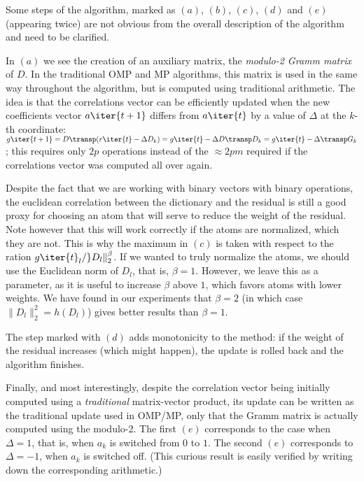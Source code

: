 \documentclass[twocolumn]{IEEEtran}
\begin{document}
Some steps of the algorithm, marked as $(a)$, $(b)$, $(c)$, $(d)$ and $(e)$ (appearing twice) are not obvious from the overall description of the algorithm and need to be clarified. 

In $(a)$ we see the creation of an auxiliary matrix, the \emph{modulo-2 Gramm matrix} of $D$. In the traditional OMP and MP algorithms, this matrix is used in the same way throughout the algorithm, but is computed using traditional arithmetic. The idea is that the correlations vector can be efficiently updated when the new coefficients vector $a\iter{t+1}$ differs from $a\iter{t}$ by a value of $\Delta$ at the $k$-th coordinate: $g\iter{t+1} = D\transp (r\iter{t} - \Delta D_k) = g\iter{t} - \Delta D\transp D_k = g\iter{t} - \Delta\transp G_k$; this requires only $2p$ operations instead of the $\approx 2pm$ required if the correlations vector was computed all over again.

Despite the fact that we are working with binary vectors with binary operations, the euclidean correlation between the dictionary and the residual is still a good proxy for choosing an atom that will serve to reduce the weight of the residual. Note however that this will work correctly if the atoms are normalized, which they are not. This is why 
the maximum in $(c)$ is taken with respect to the ration $g\iter{t}_l / \}D_l\|_2^\beta$. If we wanted to truly normalize the atoms, we should use the Euclidean norm of $D_l$, that is, $\beta=1$. However, we leave this as a parameter, as it is useful to increase $\beta$ above $1$, which favors atoms with lower weights. We have found in our experiments that $\beta=2$
(in which case $\|D_l\|_2^2=h(D_l)$) gives better results than $\beta=1$.

The step marked with $(d)$ adds monotonicity to the method: if the weight of the residual increases (which might happen), the update is rolled back and the algorithm finishes.

Finally, and most interestingly, despite the correlation vector being initially computed using a \emph{traditional} matrix-vector product, its update can be written as the traditional update used in OMP/MP, only that the Gramm matrix is actually computed using the modulo-2. The first $(e)$ corresponds to the case when $\Delta=1$, that is, when $a_k$ is switched from $0$ to $1$. The second $(e)$ corresponds to $\Delta=-1$, when $a_k$ is switched off. (This curious result is easily verified by writing down the corresponding arithmetic.) 
\end{document}
